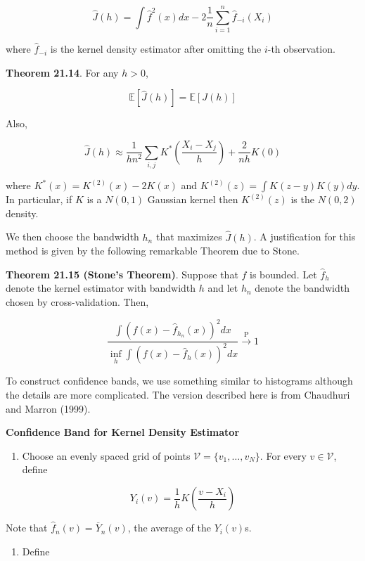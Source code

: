 \[ \hat{J}(h) = \int \hat{f}^{2}(x) dx - 2 \frac{1}{n} \sum_{i=1}^{n} \hat{f}_{-i}(X_{i}) \]

where \(\hat{f}_{-i}\) is the kernel density estimator after omitting
the \(i\)-th observation.

\textbf{Theorem 21.14}. For any \(h > 0\),

\[ \mathbb{E} \left[ \hat{J}(h) \right] = \mathbb{E} \left[ J(h) \right] \]

Also,

\[ \hat{J}(h) \approx \frac{1}{hn^{2}}\sum_{i, j} K^* \left( \frac{X_{i} - X_{j}}{h} \right) + \frac{2}{nh} K(0) \]

where \(K^*(x) = K^{(2)}(x) - 2 K(x)\) and
\(K^{(2)}(z) = \int K(z - y) K(y) dy\). In particular, if \(K\) is a
\(N(0, 1)\) Gaussian kernel then \(K^{(2)}(z)\) is the \(N(0, 2)\)
density.

We then choose the bandwidth \(h_{n}\) that maximizes \(\hat{J}(h)\). A
justification for this method is given by the following remarkable
Theorem due to Stone.

\textbf{Theorem 21.15 (Stone's Theorem)}. Suppose that \(f\) is bounded.
Let \(\hat{f}_h\) denote the kernel estimator with bandwidth \(h\) and
let \(h_{n}\) denote the bandwidth chosen by cross-validation. Then,

\[ \frac{\int \left( f(x) - \hat{f}_{h_{n}}(x)\right)^{2} dx}{\inf_h \int \left( f(x) - \hat{f}_h(x) \right)^{2} dx} \xrightarrow{\text{P}} 1\]

To construct confidence bands, we use something similar to histograms
although the details are more complicated. The version described here is
from Chaudhuri and Marron (1999).

\textbf{Confidence Band for Kernel Density Estimator}

\begin{enumerate}[tightlist,label={\arabic*.}]
\item
  Choose an evenly spaced grid of points
  \(\mathcal{V} = \{ v_{1}, \dots, v_N \}\). For every
  \(v \in \mathcal{V}\), define
\end{enumerate}

\[ Y_{i}(v) = \frac{1}{h} K \left( \frac{v - X_{i}}{h} \right) \]

Note that \(\hat{f}_{n}(v) = \overline{Y}_{n}(v)\), the average of the
\(Y_{i}(v)\)s.

\begin{enumerate}[tightlist,label={\arabic*.}]
\item
  Define
\end{enumerate}

